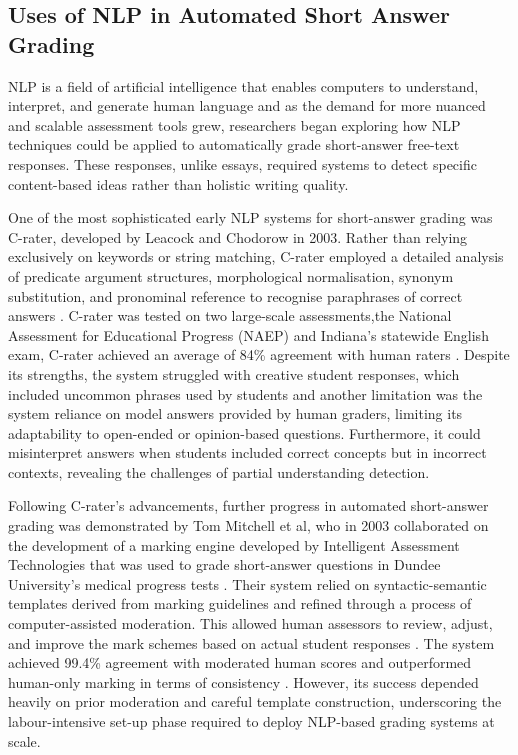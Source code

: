\documentclass[a4paper,10pt]{article}
\begin{document}
\subsection{Uses of NLP in Automated Short Answer Grading}
NLP is a field of artificial intelligence that enables computers to understand, interpret, and generate human language \cite{jurafskyspeech} and as the demand for more nuanced and scalable assessment tools grew, researchers began exploring how NLP techniques could be applied to automatically grade short-answer free-text responses. These responses, unlike essays, required systems to detect specific content-based ideas rather than holistic writing quality.\newline \newline

One of the most sophisticated early NLP systems for short-answer grading was C-rater, developed by Leacock and Chodorow in 2003. Rather than relying exclusively on keywords or string matching, C-rater employed a detailed analysis of predicate argument structures, morphological normalisation, synonym substitution, and pronominal reference to recognise paraphrases of correct answers \cite{leacock2003c}. C-rater was tested on two large-scale assessments,the National Assessment for Educational Progress (NAEP) and Indiana’s statewide English exam, C-rater achieved an average of 84\% agreement with human raters \cite{leacock2003c}.  Despite its strengths, the system struggled with creative student responses, which included uncommon phrases used by students and another limitation was the system reliance on model answers provided by human graders, limiting its adaptability to open-ended or opinion-based questions\cite{leacock2003c}. Furthermore, it could misinterpret answers when students included correct concepts but in incorrect contexts, revealing the challenges of partial understanding detection\cite{leacock2003c}.\newline \newline

Following C-rater’s advancements, further progress in automated short-answer grading was demonstrated by Tom Mitchell et al, who in 2003 collaborated on the development of a marking engine developed by Intelligent Assessment Technologies that was used to grade short-answer questions in Dundee University’s medical progress tests \cite{mitchell2003computerised}. Their system relied on syntactic-semantic templates derived from marking guidelines and refined through a process of computer-assisted moderation\cite{mitchell2003computerised}. This allowed human assessors to review, adjust, and improve the mark schemes based on actual student responses \cite{mitchell2003computerised}. The system achieved 99.4\% agreement with moderated human scores and outperformed human-only marking in terms of consistency \cite{mitchell2003computerised}. However, its success depended heavily on prior moderation and careful template construction, underscoring the labour-intensive set-up phase required to deploy NLP-based grading systems at scale\cite{mitchell2003computerised}. \newline \newline
\end{document}
